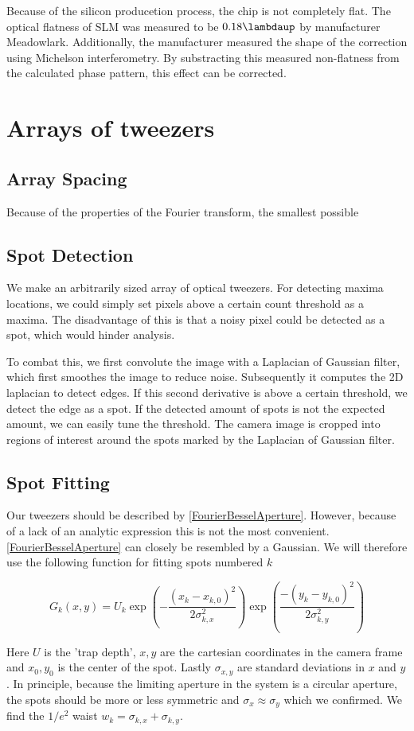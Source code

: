 Because of the silicon producetion process, the chip is not completely flat. The optical flatness of SLM was measured to be $0.18\lambdaup$ by manufacturer Meadowlark. Additionally, the manufacturer measured the shape of the correction using Michelson interferometry. By substracting this measured non-flatness from the calculated phase pattern, this effect can be corrected. 


\section{Arrays of tweezers}

\subsection{Array Spacing}

Because of the properties of the Fourier transform, the smallest possible 

\subsection{Spot Detection}

We make an arbitrarily sized array of optical tweezers. For detecting maxima locations, we could simply set pixels above a certain count threshold as a maxima. The disadvantage of this is that a noisy pixel could be detected as a spot, which would hinder analysis. 

To combat this, we first convolute the image with a Laplacian of Gaussian filter, which first smoothes the image to reduce noise. Subsequently it computes the 2D laplacian to detect edges. If this second derivative is above a certain threshold, we detect the edge as a spot. If the detected amount of spots is not the expected amount, we can easily tune the threshold. The camera image is cropped into regions of interest around the spots marked by the Laplacian of Gaussian filter. 

\subsection{Spot Fitting}

Our tweezers should be described by \cref{FourierBesselAperture}. However, because of a lack of an analytic expression this is not the most convenient. \cref{FourierBesselAperture} can closely be resembled by a Gaussian. We will therefore use the following function for fitting spots numbered $k$

\begin{equation}\label{2DGaussian}
    G_k(x,y) = U_k \exp{\left(-\frac{(x_k-x_{k,0})^2}{2\sigma_{k,x}^2}\right)}
    \exp{\left( \frac{-(y_k-y_{k,0})^2}{2\sigma_{k,y}^2} \right)}
\end{equation}

Here $U$ is the 'trap depth', $x,y$ are the cartesian coordinates in the camera frame and $x_0,y_0$ is the center of the spot. Lastly $\sigma_{x,y}$ are standard deviations in $x$ and $y$. In principle, because the limiting aperture in the system is a circular aperture, the spots should be more or less symmetric and $\sigma_x\approx \sigma_y$ which we confirmed. We find the $1/e^2$ waist $w_k=\sigma_{k,x}+\sigma_{k,y}$. 